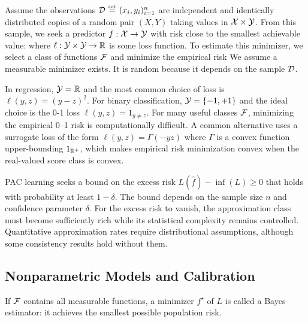 


Assume the observations $\mathcal{D} \stackrel{\mbox{\upshape\tiny def.}}{=} (x_i,y_i)_{i=1}^n$ are independent and identically distributed copies of a random pair $(X,Y)$ taking values in $\mathcal{X}\times\mathcal{Y}$. From this sample, we seek a predictor $f : \mathcal{X} \rightarrow \mathcal{Y}$ with risk close to the smallest achievable value:
where $\ell : \mathcal{Y} \times \mathcal{Y} \rightarrow \mathbb{R}$ is some loss function. 
%
To estimate this minimizer, we select a class of functions $\mathcal{F}$ and minimize the empirical risk
We assume a measurable minimizer exists. It is random because it depends on the sample $\mathcal{D}$.

\begin{exmp}
	In regression, $\mathcal{Y}=\mathbb{R}$ and the most common choice of loss is $\ell(y,z) = (y-z)^2$.
	For binary classification, $\mathcal{Y}=\{-1,+1\}$ and the ideal choice is the 0-1 loss $\ell(y,z)=1_{y \neq z}$.
	For many useful classes $\mathcal{F}$, minimizing the empirical 0--1 risk is computationally difficult. A common alternative uses a surrogate loss of the form $\ell(y,z) = \Gamma(-yz)$ where $\Gamma$ is a convex function upper-bounding $1_{\mathbb{R}^+}$, which makes empirical risk minimization convex when the real-valued score class is convex.
	\end{exmp}
	
PAC learning seeks a bound on the excess risk $L(\hat f)-\inf(L)\geq0$ that holds with probability at least $1-\delta$. The bound depends on the sample size $n$ and confidence parameter $\delta$. For the excess risk to vanish, the approximation class must become sufficiently rich while its statistical complexity remains controlled. Quantitative approximation rates require distributional assumptions, although some consistency results hold without them.


\subsection{Nonparametric Models and Calibration}

If $\mathcal{F}$ contains all measurable functions, a minimizer $f^\star$ of $L$ is called a Bayes estimator: it achieves the smallest possible population risk.


